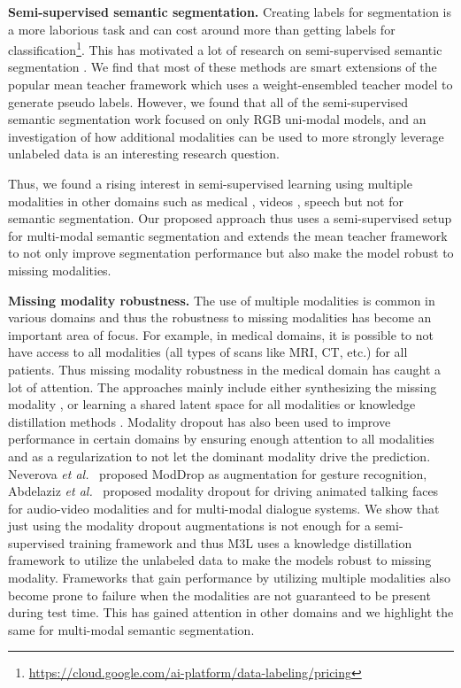 \documentclass[10pt,twocolumn,letterpaper]{article}
\begin{document}
\noindent\textbf{Semi-supervised semantic segmentation.} Creating labels for segmentation is a more laborious task and can cost around  more than getting labels for classification\footnote{\href{https://cloud.google.com/ai-platform/data-labeling/pricing}{https://cloud.google.com/ai-platform/data-labeling/pricing}}. This has motivated a lot of research on semi-supervised semantic segmentation \cite{chen2021-CPS, u2pl, zou2020pseudoseg, pc2seg, gct, cct, liu2022perturbed}. We find that most of these methods are smart extensions of the popular mean teacher framework \cite{mt} which uses a weight-ensembled teacher model to generate pseudo labels. However, we found that  all of the semi-supervised semantic segmentation work focused on only RGB uni-modal models, and an investigation of how additional modalities can be used to more strongly leverage unlabeled data is an interesting research question. 

Thus, we found a rising interest in semi-supervised learning using multiple modalities in other domains such as medical \cite{chartsias2020disentangle, 9250615}, videos \cite{xiong2021multiview}, speech \cite{sunkara2020multimodal} but not for semantic segmentation. Our proposed approach thus uses a semi-supervised setup for multi-modal semantic segmentation and extends the mean teacher \cite{mt} framework to not only improve segmentation performance but also make the model robust to missing modalities.

\noindent\textbf{Missing modality robustness.} The use of multiple modalities is common in various domains and thus the robustness to missing modalities has become an important area of focus. For example, in medical domains, it is possible to not have access to all modalities (all types of scans like MRI, CT, etc.) for all patients. 
Thus missing modality robustness in the medical domain has caught a lot of attention.
The approaches mainly include either synthesizing the missing modality \cite{jog2017random, sharma2019missing, yu20183d}, or learning a shared latent space for all modalities \cite{shen2019brain, urn, dorent2019hetero} or knowledge distillation methods \cite{wang2020multimodal, azad2022smu}. Modality dropout has also been used to improve performance in certain domains by ensuring enough attention to all modalities and as a regularization to not let the dominant modality drive the prediction. 
Neverova \textit{et al.}~\cite{neverova2015moddrop} proposed ModDrop as augmentation for gesture recognition, Abdelaziz \textit{et al.}~\cite{hussen2020modality} proposed modality dropout for driving animated talking faces for audio-video modalities and \cite{9746613} for multi-modal dialogue systems. 
We show that just using the modality dropout augmentations is not enough for a semi-supervised training framework and thus M3L uses a knowledge distillation framework to utilize the unlabeled data to make the models robust to missing modality.
Frameworks that gain performance by utilizing multiple modalities also become prone to failure when the modalities are not guaranteed to be present during test time. This has gained attention in other domains and we highlight the same for multi-modal semantic segmentation. 
\end{document}
